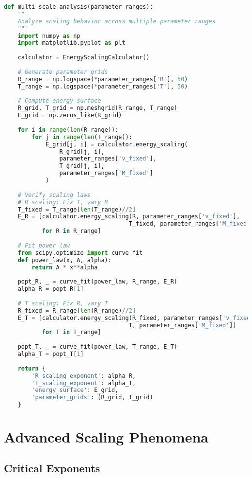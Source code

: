 \documentclass[12pt,a4paper]{article}
\begin{document}
\begin{lstlisting}[language=Python]
def multi_scale_analysis(parameter_ranges):
    """
    Analyze scaling behavior across multiple parameter ranges
    """
    import numpy as np
    import matplotlib.pyplot as plt
    
    calculator = EnergyScalingCalculator()
    
    # Generate parameter grids
    R_range = np.logspace(*parameter_ranges['R'], 50)
    T_range = np.logspace(*parameter_ranges['T'], 50)
    
    # Compute energy surface
    R_grid, T_grid = np.meshgrid(R_range, T_range)
    E_grid = np.zeros_like(R_grid)
    
    for i in range(len(R_range)):
        for j in range(len(T_range)):
            E_grid[j, i] = calculator.energy_scaling(
                R_grid[j, i], 
                parameter_ranges['v_fixed'], 
                T_grid[j, i],
                parameter_ranges['M_fixed']
            )
    
    # Verify scaling laws
    # R scaling: Fix T, vary R
    T_fixed = T_range[len(T_range)//2]
    E_R = [calculator.energy_scaling(R, parameter_ranges['v_fixed'], 
                                    T_fixed, parameter_ranges['M_fixed']) 
           for R in R_range]
    
    # Fit power law
    from scipy.optimize import curve_fit
    def power_law(x, A, alpha):
        return A * x**alpha
    
    popt_R, _ = curve_fit(power_law, R_range, E_R)
    alpha_R = popt_R[1]
    
    # T scaling: Fix R, vary T
    R_fixed = R_range[len(R_range)//2]
    E_T = [calculator.energy_scaling(R_fixed, parameter_ranges['v_fixed'], 
                                    T, parameter_ranges['M_fixed']) 
           for T in T_range]
    
    popt_T, _ = curve_fit(power_law, T_range, E_T)
    alpha_T = popt_T[1]
    
    return {
        'R_scaling_exponent': alpha_R,
        'T_scaling_exponent': alpha_T,
        'energy_surface': E_grid,
        'parameter_grids': (R_grid, T_grid)
    }
\end{lstlisting}

\section{Advanced Scaling Phenomena}

\subsection{Critical Exponents}
\end{document}
